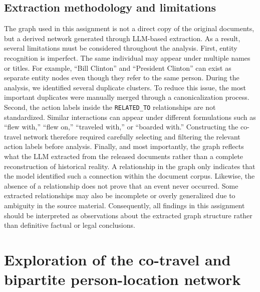 \subsection{Extraction methodology and limitations}
The graph used in this assignment is not a direct copy of the original documents, but a derived network generated through LLM-based extraction. As a result, several limitations must be considered throughout the analysis.
First, entity recognition is imperfect. The same individual may appear under multiple names or titles. For example, ``Bill Clinton'' and ``President Clinton'' can exist as separate entity nodes even though they refer to the same person. During the analysis, we identified several duplicate clusters. To reduce this issue, the most important duplicates were manually merged through a canonicalization process.
Second, the action labels inside the \texttt{RELATED\_TO} relationships are not standardized. Similar interactions can appear under different formulations such as ``flew with,'' ``flew on,'' ``traveled with,'' or ``boarded with.'' Constructing the co-travel network therefore required carefully selecting and filtering the relevant action labels before analysis.
Finally, and most importantly, the graph reflects what the LLM extracted from the released documents rather than a complete reconstruction of historical reality. A relationship in the graph only indicates that the model identified such a connection within the document corpus. Likewise, the absence of a relationship does not prove that an event never occurred. Some extracted relationships may also be incomplete or overly generalized due to ambiguity in the source material.
Consequently, all findings in this assignment should be interpreted as observations about the extracted graph structure rather than definitive factual or legal conclusions.
\section{Exploration of the co-travel and bipartite person-location network}
